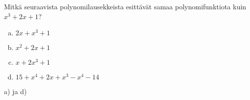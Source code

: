 %

\begin{tehtava}
	Mitkä seuraavista polynomilausekkeista esittävät samaa polynomifunktiota kuin
	$x^3+2x+1$?
	\begin{enumerate}[a)]
		\item $2x+x^3+1$
		\item $x^2+2x+1$
		\item $x+2x^3+1$
		\item $15+x^4+2x+x^3-x^4-14$
	\end{enumerate}
	\begin{vastaus}
		a) ja d)
	\end{vastaus}
\end{tehtava}
